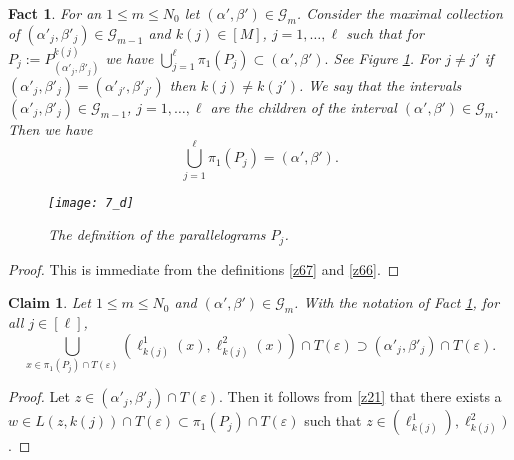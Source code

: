 \documentclass[amssymb,amsfonts,12pt,verbatim,righttag,oneside]{amsart}
\numberwithin{equation}{section} %
\theoremstyle{plain}
\theoremstyle{plain}
\newtheorem{claim}[theorem]{Claim}
\newtheorem{fact}[theorem]{Fact}
\begin{document}
\begin{fact}\label{z25}  %
 For an $1\leq m\leq N_0$ let $(\alpha ',\beta ')\in \mathcal{G}_m$.
 Consider the maximal collection of
    $(\alpha '_j,\beta '_j)\in\mathcal{G}_{m-1}$
    and $k(j)\in[M]$, $j=1,\dots  ,\ell $  such that for
$
P_j:= P _{(\alpha '_j,\beta '_j) }^{k(j) }
$ we have $\bigcup\limits_{j=1}^{\ell }
\pi_1\left(
P _j
 \right)\subset (\alpha ',\beta ').$
 See Figure \ref{y95}.
 For $j\ne j'$ if $(\alpha '_j,\beta '_j)=(\alpha '_{j'},\beta '_{j'})$ then
 $k(j)\ne k(j')$.
 We say that the intervals $ (\alpha '_j,\beta '_j) \in \mathcal{G}_{m-1}$, $j=1,\dots  ,\ell $ are the children of the interval $(\alpha ',\beta ')\in \mathcal{G}_m$. Then we have
\begin{equation}
\label{z24}
\bigcup\limits_{j=1}^{\ell }
\pi_1\left(
P _j
 \right)= (\alpha ',\beta ').
\end{equation}


\begin{figure}[ht!]
    \texttt{[image: 7\_d]}
    \caption{The definition of the parallelograms $P_j$. }
    \label{y95}
    \end{figure}
\end{fact}



\begin{proof}
This is immediate from the definitions
    \eqref{z67} and \eqref{z66}.
\end{proof}




\begin{claim}\label{z20}%
  Let $1\leq m\leq N_0$ and $(\alpha ',\beta ')\in \mathcal{G}_m$. With the notation of Fact \ref{z25}, for all $j\in[\ell ]$,
  \begin{equation}
  \label{z19}
  \bigcup\limits_{x\in \pi _1\left( P_j\right)\cap T(\varepsilon )}
  \left( \ell  _{k(j)}^{1}(x),\ell  _{k(j)}^{2}(x) \right)\cap T(\varepsilon )
  \supset
  (\alpha '_j,\beta '_j)\cap T(\varepsilon ).
  \end{equation}
\end{claim}
\begin{proof}
 Let $z\in  (\alpha '_j,\beta '_j)\cap T(\varepsilon )$.
 Then it follows from \eqref{z21} that
there exists a $w\in L(z,k(j))\cap T(\varepsilon )\subset \pi _1(P_j)\cap T(\varepsilon )$ such that
$z\in (\ell  _{k(j)}^{1 }),\ell  _{k(j)}^{2 })$.
\end{proof}
\end{document}
